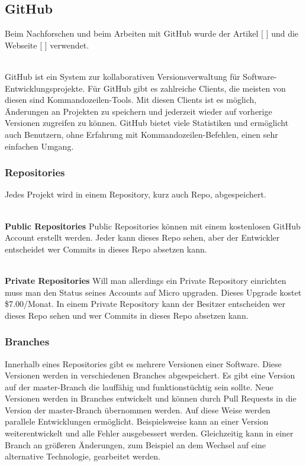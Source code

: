 \documentclass[FIPLY_base.tex]{subfiles}
\author{Andreas Denkmayr}
\date{13. März 2016}
\begin{document}
\subsection{GitHub}
Beim Nachforschen und beim Arbeiten mit GitHub wurde der Artikel [ \cite{t3nGithub}] und die Webseite [ \cite{github}] verwendet. 

\ \\
GitHub ist ein System zur kollaborativen Versionsverwaltung für Software-Entwicklungsprojekte.
Für GitHub gibt es zahlreiche Clients, die meisten von diesen sind Kommandozeilen-Tools.
Mit diesen Clients ist es möglich, Änderungen an Projekten zu speichern und jederzeit wieder auf vorherige Versionen zugreifen zu können.
GitHub bietet viele Statistiken und ermöglicht auch Benutzern, ohne Erfahrung mit Kommandozeilen-Befehlen, einen sehr einfachen Umgang.

\subsubsection{Repositories}
Jedes Projekt wird in einem Repository, kurz auch Repo, abgespeichert.

\ \\
\textbf{Public Repositories}
Public Repositories können mit einem kostenlosen GitHub Account erstellt werden.
Jeder kann dieses Repo sehen, aber der Entwickler entscheidet wer Commits in dieses Repo absetzen kann.

\ \\
\textbf{Private Repositories}
Will man allerdings ein Private Repository einrichten muss man den Status seines Accounts auf Micro upgraden.
Dieses Upgrade kostet \$7.00/Monat. In einem Private Repository kann der Besitzer entscheiden wer dieses Repo sehen und wer Commits in dieses Repo absetzen kann.

\subsubsection{Branches}
Innerhalb eines Repositories gibt es mehrere Versionen einer Software. Diese Versionen werden in verschiedenen Branches abgespeichert.
Es gibt eine Version auf der master-Branch die lauffähig und funktionstüchtig sein sollte.
Neue Versionen werden in Branches entwickelt und können durch Pull Requests in die Version der master-Branch übernommen werden. 
Auf diese Weise werden parallele Entwicklungen ermöglicht. Beispielsweise kann an einer Version weiterentwickelt und alle Fehler ausgebessert werden.
Gleichzeitig kann in einer Branch an größeren Änderungen, zum Beispiel an dem Wechsel auf eine alternative Technologie, gearbeitet werden.
\end{document}
